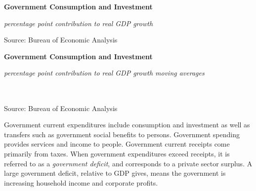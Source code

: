 \documentclass{report}
\makeatletter
\newcommand{\tbllink}[1]{\href{https://raw.githubusercontent.com/bdecon/US-chartbook/master/chartbook/data/#1}{\faTable}}
\newcommand*\short[1]{\expandafter\@gobbletwo\number\numexpr#1\relax}
\newcommand{\sbar}[4]{
		\addplot[ybar stacked, bar width=2.6pt, draw opacity=0, fill=#1] 
			table [x=#2, y=#3, col sep=comma]{#4};}
\newcommand{\dateaxisticks}{
		date coordinates in=x, axis line style={draw=none},
		xmax={2020-08-10},
		max space between ticks=40,	    
		xtick={{1990-01-01}, {1992-01-01}, {1994-01-01}, 
			{1996-01-01}, {1998-01-01}, {2000-01-01}, 
			{2002-01-01}, {2004-01-01}, {2006-01-01},
			{2008-01-01}, {2010-01-01}, {2012-01-01}, {2014-01-01},
		    {2016-01-01}, {2018-01-01}, {2020-01-01}},
		minor xtick={{1989-01-01}, {1991-01-01}, {1993-01-01},
			{1995-01-01}, {1997-01-01}, {1999-01-01}, 
			{2001-01-01}, {2003-01-01}, {2005-01-01}, {2007-01-01},
		    {2009-01-01}, {2011-01-01}, {2013-01-01}, {2015-01-01},
		    {2017-01-01}, {2019-01-01}},
		enlarge y limits={0.06}, enlarge x limits={0.01},
		}
\newcommand{\bbar}[2]{extra #1 ticks = {{#2}}, extra #1 tick labels = ,
		extra #1 tick style = {grid=major, grid style={thick, black!25}},}
\newcommand{\rbars}{
		\fill[color=black!10] (axis cs:{1990-07-01},\pgfkeysvalueof{/pgfplots/ymin}) rectangle 
			(axis cs:{1991-03-01}, \pgfkeysvalueof{/pgfplots/ymax});
		\fill[color=black!10] (axis cs:{2007-12-01},\pgfkeysvalueof{/pgfplots/ymin}) rectangle 
			(axis cs:{2009-07-01}, \pgfkeysvalueof{/pgfplots/ymax});
		\fill[color=black!10] (axis cs:{2001-03-01},\pgfkeysvalueof{/pgfplots/ymin}) rectangle 
			(axis cs:{2001-11-01}, \pgfkeysvalueof{/pgfplots/ymax});
		\fill[color=black!10] (axis cs:{2020-02-01},\pgfkeysvalueof{/pgfplots/ymin}) rectangle 
			(axis cs:{2020-09-01}, \pgfkeysvalueof{/pgfplots/ymax});}
\makeatother
\begin{document}
{{{{\begin{minipage}{0.76\textwidth}
\normalsize \textbf{Government Consumption and Investment}

\footnotesize{\textit{percentage point contribution to real GDP growth}}

\hspace*{-2mm} 

\footnotesize{Source: Bureau of Economic Analysis} \hfill \tbllink{gov.csv}

\end{minipage}
\vspace{6mm}

\noindent \normalsize \textbf{Government Consumption and Investment}\\
\footnotesize{\textit{percentage point contribution to real GDP growth \hspace{37mm} moving averages}\\ \vspace{4mm}
\noindent {} \setlength{\tabcolsep}{3.1pt} \color{black!90}
		{\renewcommand{\arraystretch}{1.55}
		 \begin{tabular}{p{42mm} R{6.7mm} R{6.7mm} R{6.7mm} R{6.7mm} R{6.7mm} 
		   R{7.8mm} R{6.7mm} R{6.7mm} }
			 \hline
		\end{tabular}
		}	\\
		
\vspace{-6mm}
\footnotesize{Source: Bureau of Economic Analysis}


\newpage

\begin{minipage}{0.76\textwidth}

\small Government current expenditures include consumption and investment as well as transfers such as government social benefits to persons. Government spending provides services and income to people. Government current receipts come primarily from taxes. When government expenditures exceed receipts, it is referred to as a \textit{government deficit}, and corresponds to a private sector surplus. A large government deficit, relative to GDP gives, means the government is increasing household income and corporate profits.\\


\end{minipage}}}}}}
\end{document}
